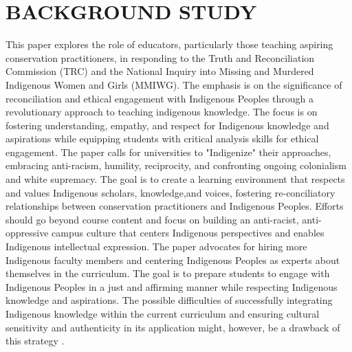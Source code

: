 \documentclass[a4paper,twoside]{article}
\begin{document}
\section{\uppercase{Background Study}}
\label{sec:Literature Review}
This paper explores the role of educators, particularly those teaching aspiring conservation practitioners, in responding to the Truth and Reconciliation Commission (TRC) and the National Inquiry into Missing and Murdered Indigenous Women and Girls (MMIWG). The emphasis is on the significance of reconciliation and ethical engagement with Indigenous Peoples through a revolutionary approach to teaching indigenous knowledge. The focus is on fostering understanding, empathy, and respect for Indigenous knowledge and aspirations while equipping students with critical analysis skills for ethical engagement. The paper calls for universities to "Indigenize" their approaches, embracing anti-racism, humility, reciprocity, and confronting ongoing colonialism and white supremacy. The goal is to create a learning environment that respects and values Indigenous scholars, knowledge,and voices, fostering re-conciliatory relationships between conservation practitioners and Indigenous Peoples. Efforts should go beyond course content and focus on building an anti-racist, anti-oppressive campus culture that
centers Indigenous perspectives and enables Indigenous intellectual expression. The paper advocates for hiring more Indigenous faculty members and centering Indigenous Peoples as experts about themselves in the curriculum. The goal is to prepare students to engage with Indigenous Peoples in a just and affirming manner while respecting Indigenous knowledge and aspirations. The possible difficulties of successfully integrating Indigenous knowledge within the current curriculum and ensuring cultural sensitivity and authenticity in its application might, 
 however, be a drawback of this strategy \cite{Wu19}.
\end{document}
